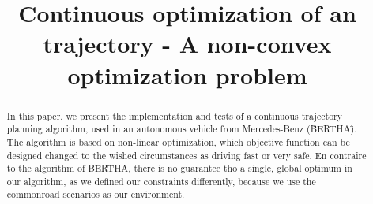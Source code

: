 \documentclass[conference]{IEEEtran}
\begin{document}


%
\title{Continuous optimization of an trajectory - A non-convex optimization problem}


\author{
}





\maketitle

\begin{abstract}
In this paper, we present the implementation and tests of a continuous trajectory planning algorithm, used in an autonomous vehicle from Mercedes-Benz (\"BERTHA\"). The algorithm is based on non-linear optimization, which objective function can be designed changed to the wished circumstances as driving fast or very safe. En contraire to the algorithm of BERTHA,  there is no guarantee tho a single, global optimum in our algorithm, as we defined our constraints differently, because we use the commonroad scenarios as our environment.
\end{abstract}





%
\IEEEpeerreviewmaketitle
\end{document}
